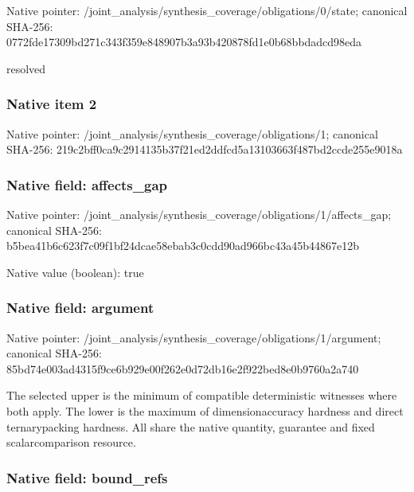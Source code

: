 \documentclass[10pt,a4paper]{article}
\begin{document}
Native pointer: /joint\_analysis/synthesi\allowbreak{}s\_coverage/obligations/0\allowbreak{}/state; canonical SHA-256: 0772fde17309bd271c343f35\allowbreak{}9e848907b3a93b420878fd1e\allowbreak{}0b68bbdadcd98eda


resolved


\subsubsection{Native item 2}


Native pointer: /joint\_analysis/synthesi\allowbreak{}s\_coverage/obligations/1; canonical SHA-256: 219c2bff0ca9c2914135b37f\allowbreak{}21ed2ddfcd5a13103663f487\allowbreak{}bd2ccde255e9018a



\subsubsection{Native field: affects\_gap}


Native pointer: /joint\_analysis/synthesi\allowbreak{}s\_coverage/obligations/1\allowbreak{}/affects\_gap; canonical SHA-256: b5bea41b6c623f7c09f1bf24\allowbreak{}dcae58ebab3c0cdd90ad966b\allowbreak{}c43a45b44867e12b



Native value (boolean): true



\subsubsection{Native field: argument}


Native pointer: /joint\_analysis/synthesi\allowbreak{}s\_coverage/obligations/1\allowbreak{}/argument; canonical SHA-256: 85bd74e003ad4315f9ce6b92\allowbreak{}9e00f262e0d72db16e2f922b\allowbreak{}ed8e0b9760a2a740


The selected upper is the minimum of compatible deterministic witnesses where both apply. The lower is the maximum of dimensionaccuracy hardness and direct ternarypacking hardness. All share the native quantity, guarantee and fixed scalarcomparison resource.


\subsubsection{Native field: bound\_refs}
\end{document}
